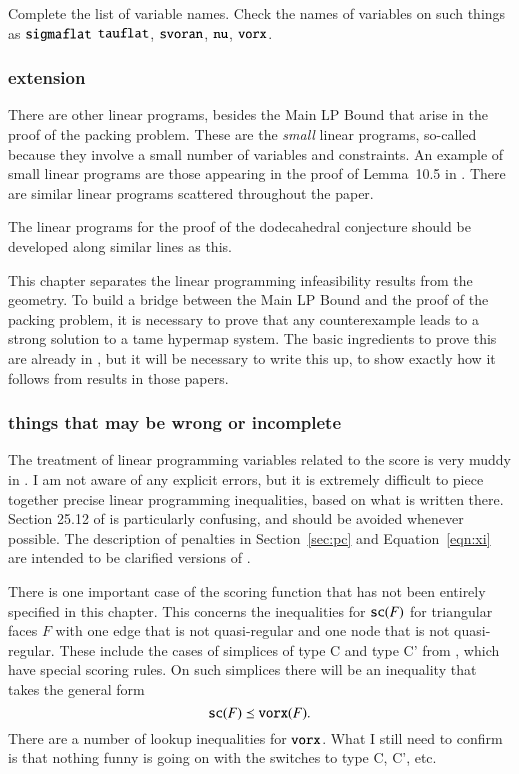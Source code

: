 Complete the list of variable names.  Check the names of variables
on such things as ${\operatorname{{\texttt{sigmaflat}}}}$ ${\operatorname{{\texttt{tauflat}}}}$,
${\operatorname{{\texttt{svoran}}}}$, ${\operatorname{{\texttt{nu}}}}$, ${\operatorname{{\texttt{vorx}}}}$.

\subsubsection{extension}

There are other linear programs, besides the Main LP Bound that
arise in the proof of the packing problem.  These are the {\it
small} linear programs, so-called because they involve a small
number of variables and constraints.  An example of small linear
programs are those appearing in the proof of Lemma~10.5 in
\cite{DCG}.  There are similar linear programs scattered
throughout the paper.

The linear programs for the proof of the dodecahedral conjecture
should be developed along similar lines as this.

This chapter separates the linear programming infeasibility
results from the geometry.  To build a bridge between the Main LP
Bound and the proof of the packing problem, it is necessary to
prove that any counterexample  leads to a
strong solution to a tame hypermap system.  The basic ingredients
to prove this are already in \cite{DCG}, but it will be necessary
to write this up, to show exactly how it follows from results in
those papers.




\subsubsection{things that may be wrong or incomplete}
\label{sec:wrong}

The treatment of linear programming variables related to the score
is very muddy in \cite{DCG}.   I am not aware of any explicit
errors, but it is extremely difficult to piece together precise
linear programming inequalities, based on what is written there.
Section 25.12 of \cite{DCG} is particularly confusing, and should
be avoided whenever possible.  The description of penalties in
Section~\ref{sec:pc} and Equation~\ref{eqn:xi} are intended to be
clarified versions of \cite{DCG}.

There is one important case of the scoring function that has not
been entirely specified in this chapter.  This concerns the
inequalities for ${\operatorname{{\texttt{sc}}}}(F)$ for triangular faces $F$ with one
edge that is not quasi-regular and one node that is not
quasi-regular.  These include the cases of simplices of type C and
type C' from \cite[Sec.9.4,pp.94--99]{DCG}, which have special
scoring rules.  On such simplices there will be an inequality that
takes the general form
    $$
    {\operatorname{{\texttt{sc}}}}(F)\preceq {\operatorname{{\texttt{vorx}}}}(F).
    $$
There are a number of lookup inequalities for ${\operatorname{{\texttt{vorx}}}}$.  What
I still need to confirm is that nothing funny is going on with the
switches to type C, C', etc.


